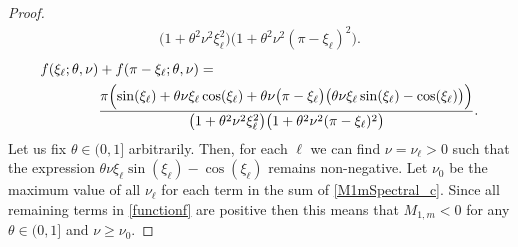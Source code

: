 \documentclass[a4paper]{article}
\begin{document}
\begin{description}[style=unboxed,leftmargin=0cm]
\begin{proof}
\begin{align}
					{\bigl(1+\theta^2\nu^2\xi_\ell^2\bigr)\bigl(1+\theta^2\nu^2(\pi-\xi_\ell)^2\bigr)}.
		\end{align}
	\else
		\begin{align}\label{functionf}
			f(\xi_\ell; \theta, \nu) &+ f(\pi-\xi_\ell; \theta, \nu) = \\
				&\frac{\pi\Bigl(\sin(\xi_\ell) + \theta\nu\xi_\ell\cos(\xi_\ell) +
				\theta\nu\bigl(\pi-\xi_\ell\bigr)\bigl(\theta\nu\xi_\ell\sin(\xi_\ell)-\cos(\xi_\ell)\bigr)\Bigr)}
					{\bigl(1+\theta^2\nu^2\xi_\ell^2\bigr)\bigl(1+\theta^2\nu^2(\pi-\xi_\ell)^2\bigr)}.
		\end{align}
	\fi
	Let us fix $\theta \in (0,1]$ arbitrarily.
	Then, for each $\ell$ we can find $\nu = \nu_\ell > 0$ such that the expression
	$\theta\nu\xi_\ell\sin(\xi_\ell)-\cos(\xi_\ell)$ remains non-negative.
	Let $\nu_0$ be the maximum value of all $\nu_\ell$ for each term in the sum of \eqref{M1mSpectral_c}.
	Since all remaining terms in \eqref{functionf} are positive then this means that $M_{1,m} < 0$ for any
	$\theta \in (0,1]$ and $\nu \ge \nu_0$.
\end{proof}


\end{description}
\end{document}
